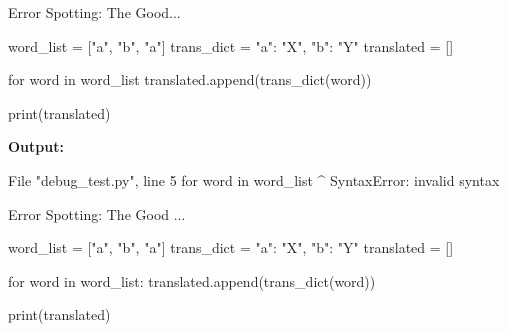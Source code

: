\begin{frame}[fragile]{Error Spotting: The Good...}

    \begin{pythoncode}
    word_list   = ["a", "b", "a"]
    trans_dict  = {"a": "X", "b": "Y"}
    translated  = []

    for word in word_list
        translated.append(trans_dict(word))

    print(translated)
    \end{pythoncode}

    \pause
    \textbf{Output:}

    \begin{outputcode}
      File "debug_test.py", line 5
        for word in word_list
                            ^
    SyntaxError: invalid syntax
    \end{outputcode}

\end{frame}

\begin{frame}[fragile]{Error Spotting: The Good ...}

    \begin{pythoncode}
    word_list   = ["a", "b", "a"]
    trans_dict  = {"a": "X", "b": "Y"}
    translated  = []

    for word in word_list:
        translated.append(trans_dict(word))

    print(translated)
    \end{pythoncode}


\end{frame}

